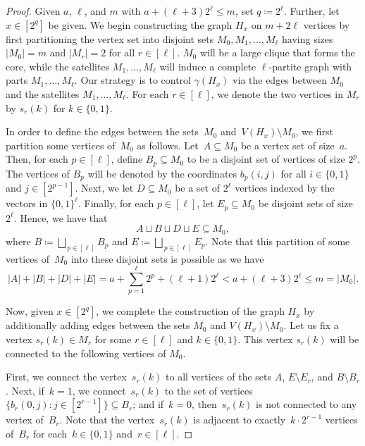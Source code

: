 \documentclass[11pt, final]{article}
\theoremstyle{definition}
\begin{document}
\begin{proof}
Given $a$, $\ell$, and $m$ with $a + (\ell +3)2^\ell \leq m$, set $q \coloneqq 2^\ell$. Further, let $x \in [2^q]$ be given. We begin constructing the graph $H_x$ on $m+2\ell$ vertices by first partitioning the vertex set into disjoint sets $M_0, M_1, \dots, M_{\ell}$ having sizes $|M_0| = m$ and $|M_r| = 2$ for all $r \in [\ell]$. $M_0$ will be a large clique that forms the core, while the satellites $M_1,\dots,M_\ell$ will induce a complete $\ell$-partite graph with parts $M_1,\dots,M_\ell$. Our strategy is to control $\gamma(H_x)$ via the edges between $M_0$ and the satellites $M_1,\dots,M_\ell$. For each $r\in [\ell]$, we denote the two vertices in $M_r$ by $s_r(k)$ for $k \in \{0,1\}$. 

In order to define the edges between the sets~$M_0$ and~$V(H_x)\setminus M_0$, we first partition some vertices of~$M_0$ as follows. Let~$A \subseteq M_0$ be a vertex set of size~$a$. Then, for each $p\in [\ell]$, define $B_p \subseteq M_0$ to be a disjoint set of vertices of size $2^{p}$. The vertices of $B_p$ will be denoted by the coordinates $b_p(i,j)$ for all $i \in \{0,1\}$ and $j \in [2^{p-1}]$. Next, we let $D \subseteq M_0$ be a set of $2^\ell$ vertices indexed by the vectors in $\{0,1\}^\ell$. Finally, for each $p\in[\ell]$, let $E_p \subseteq M_0$ be disjoint sets of size $2^\ell$. Hence, we have that $$ A \sqcup B \sqcup D  \sqcup E \subseteq M_0,$$ where $B \coloneqq \bigsqcup_{\,p\in [\ell]} B_p$ and $E \coloneqq \bigsqcup_{\,p\in [\ell]} E_p$. Note that this partition of some vertices of~$M_0$ into these disjoint sets is possible as we have $$|A| + |B| + |D| + |E| = a + \sum_{p=1}^{\ell} 2^p  + (\ell +1)2^\ell < a + (\ell+3)2^{\ell} \leq m = |M_0|.$$


Now, given $x \in [2^{q}]$, we complete the construction of the graph $H_x$ by additionally adding edges between the sets $M_0$ and $V(H_x) \setminus M_0$. Let us fix a vertex $s_r(k) \in M_r$ for some $r \in [\ell]$ and $k \in \{0,1\}$. This vertex $s_r(k)$ will be connected to the following vertices of $M_0$. 

First, we connect the vertex~$s_r(k)$ to all vertices of the sets $A$, $E \setminus E_r$, and $B \setminus B_r$. Next, if~$k = 1$, we connect~$s_r(k)$ to the set of vertices $\{b_r(0,j): j \in [2^{r-1}]\} \subseteq B_r$; and if~$k =0$, then~$s_r(k)$ is not connected to any vertex of~$B_r$. Note that the vertex~$s_r(k)$ is adjacent to exactly~$k\cdot2^{r-1}$ vertices of~$B_r$ for each~$k \in \{0,1\}$ and~$r \in [\ell]$.


\end{proof}
\end{document}
